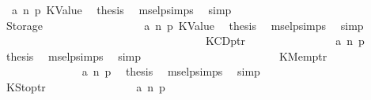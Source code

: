 \begin{isabellebody}
\ {}\ a{}\ n\ p{}\ KValue\ \isamarkupfalse%
\ {\isacharquery}{\kern0pt}thesis\ \isamarkupfalse%
\ msel{\isachardot}{\kern0pt}psimps{\isacharparenleft}{\kern0pt}{}{\isacharparenright}{\kern0pt}\ \isamarkupfalse%
\ simp\isanewline
\ \ \ \ \ \ \ \ \ \ \ \ \isamarkupfalse%
\isanewline
\ \ \ \ \ \ \ \ \ \ \ \ \ \ \isamarkupfalse%
\ {\isacharparenleft}{\kern0pt}Storage\ {\isacharunderscore}{\kern0pt}{\isacharparenright}{\kern0pt}\isanewline
\ \ \ \ \ \ \ \ \ \ \ \ \ \ \isamarkupfalse%
\ {}\ a{}\ n\ p{}\ KValue\ \isamarkupfalse%
\ {\isacharquery}{\kern0pt}thesis\ \isamarkupfalse%
\ msel{\isachardot}{\kern0pt}psimps{\isacharparenleft}{\kern0pt}{}{\isacharparenright}{\kern0pt}\ \isamarkupfalse%
\ simp\isanewline
\ \ \ \ \ \ \ \ \ \ \ \ \isamarkupfalse%
\isanewline
\ \ \ \ \ \ \ \ \ \ \isamarkupfalse%
\isanewline
\ \ \ \ \ \ \ \ \ \ \ \ \isamarkupfalse%
\ {\isacharparenleft}{\kern0pt}KCDptr\ {\isacharunderscore}{\kern0pt}{\isacharparenright}{\kern0pt}\isanewline
\ \ \ \ \ \ \ \ \ \ \ \ \isamarkupfalse%
\ {}\ a{}\ n\ p{}\ \isamarkupfalse%
\ {\isacharquery}{\kern0pt}thesis\ \isamarkupfalse%
\ msel{\isachardot}{\kern0pt}psimps{\isacharparenleft}{\kern0pt}{}{\isacharparenright}{\kern0pt}\ \isamarkupfalse%
\ simp\isanewline
\ \ \ \ \ \ \ \ \ \ \isamarkupfalse%
\isanewline
\ \ \ \ \ \ \ \ \ \ \ \ \isamarkupfalse%
\ {\isacharparenleft}{\kern0pt}KMemptr\ {\isacharunderscore}{\kern0pt}{\isacharparenright}{\kern0pt}\isanewline
\ \ \ \ \ \ \ \ \ \ \ \ \isamarkupfalse%
\ {}\ a{}\ n\ p{}\ \isamarkupfalse%
\ {\isacharquery}{\kern0pt}thesis\ \isamarkupfalse%
\ msel{\isachardot}{\kern0pt}psimps{\isacharparenleft}{\kern0pt}{}{\isacharparenright}{\kern0pt}\ \isamarkupfalse%
\ simp\isanewline
\ \ \ \ \ \ \ \ \ \ \isamarkupfalse%
\isanewline
\ \ \ \ \ \ \ \ \ \ \ \ \isamarkupfalse%
\ {\isacharparenleft}{\kern0pt}KStoptr\ {\isacharunderscore}{\kern0pt}{\isacharparenright}{\kern0pt}\isanewline
\ \ \ \ \ \ \ \ \ \ \ \ \isamarkupfalse%
\ {}\ a{}\ n\ p{}\ \isamarkupfalse%

\end{isabellebody}

